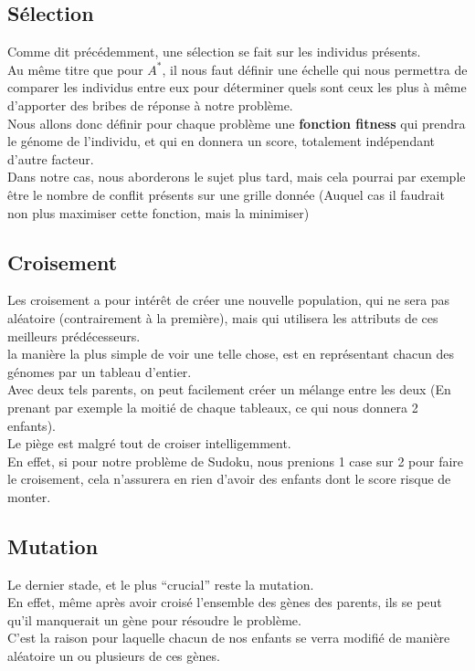         \subsection{Sélection}
            Comme dit précédemment, une sélection se fait sur les individus présents.\\
            Au même titre que pour $A^*$, il nous faut définir une échelle qui nous permettra de comparer les individus entre eux pour déterminer quels sont ceux les plus à même d'apporter des bribes de réponse à notre problème.\\
            Nous allons donc définir pour chaque problème une \textbf{fonction fitness} qui prendra le génome de l'individu, et qui en donnera un score, totalement indépendant d'autre facteur.\\
            Dans notre cas, nous aborderons le sujet plus tard, mais cela pourrai par exemple être le nombre de conflit présents sur une grille donnée (Auquel cas il faudrait non plus maximiser cette fonction, mais la minimiser)
        \subsection{Croisement}
            Les croisement a pour intérêt de créer une nouvelle population, qui ne sera pas aléatoire (contrairement à la première), mais qui utilisera les attributs de ces meilleurs prédécesseurs.\\
            la manière la plus simple de voir une telle chose, est en représentant chacun des génomes par un tableau d'entier.\\
            Avec deux tels parents, on peut facilement créer un mélange entre les deux (En prenant par exemple la moitié de chaque tableaux, ce qui nous donnera 2 enfants).\\
            Le piège est malgré tout de croiser intelligemment.\\
            En effet, si pour notre problème de Sudoku, nous prenions 1 case sur 2 pour faire le croisement, cela n'assurera en rien d'avoir des enfants dont le score risque de monter.
        \subsection{Mutation}
            Le dernier stade, et le plus ``crucial'' reste la mutation.\\
            En effet, même après avoir croisé l'ensemble des gènes des parents, ils se peut qu'il manquerait un gène pour résoudre le problème.\\
            C'est la raison pour laquelle chacun de nos enfants se verra modifié de manière aléatoire un ou plusieurs de ces gènes.
